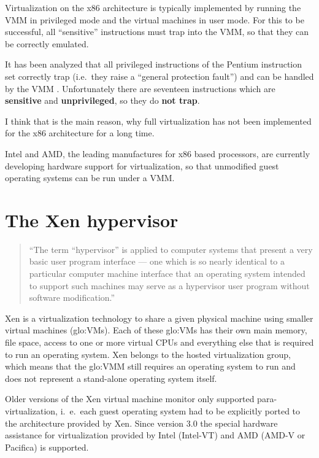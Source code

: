 Virtualization on the x86 architecture is typically implemented by running
the VMM in privileged mode and the virtual machines in user mode. For this
to  be successful,  all ``sensitive''  instructions \cite{popek74,popek75}
must trap into the VMM, so that they can be correctly emulated.

It  has been  analyzed that  all  privileged instructions  of the  Pentium
instruction  set correctly  trap (i.e.~they  raise a  ``general protection
fault'')   and  can   be  handled   by  the   VMM  \cite{robin00analysis}.
Unfortunately    there    are    seventeen    instructions    which    are
\textbf{sensitive}  and  \textbf{unprivileged},  so  they  do  \textbf{not
  trap}.

I think  that is  the main  reason, why full  virtualization has  not been
implemented for the x86 architecture for a long time.

Intel  and AMD,  the leading  manufactures for  x86 based  processors, are
currently  developing   hardware  support  for   virtualization,  so  that
unmodified guest operating systems can be run under a VMM.

\section{The Xen hypervisor}
\label{sec:xen-hypervisor}

\begin{quote}
  ``The term “hypervisor” is applied to computer systems that present a very
basic user  program interface ---  one which is  so nearly identical  to a
particular computer machine interface that an operating system intended to
support  such machines  may serve  as  a hypervisor  user program  without
software modification.'' \cite{hendricks79}
\end{quote}

\bigskip

Xen \cite{xen}  is a virtualization  technology to share a  given physical
machine  using smaller  virtual machines  (\gls{glo:VM}s).  Each  of these
\gls{glo:VM}s has their own main memory, file space, access to one or more
virtual  CPUs and everything  else that  is required  to run  an operating
system.  Xen belongs to the  hosted virtualization group, which means that
the \gls{glo:VMM} still  requires an operating system to  run and does not
represent a stand-alone operating system itself.

Older  versions  of  the   Xen  virtual  machine  monitor  only  supported
para-virtualization,   i.~e.~each  guest  operating   system  had   to  be
explicitly ported to the architecture  provided by Xen.  Since version 3.0
the  special  hardware assistance  for  virtualization  provided by  Intel
(Intel-VT) and AMD (AMD-V or Pacifica) is supported.

